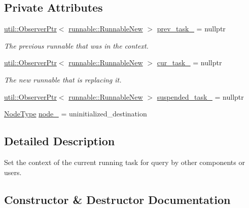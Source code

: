 \subsection*{Private Attributes}
\begin{DoxyCompactItemize}
\item 
\hyperlink{namespacevt_1_1util_a7d480434049896696b9a50c38a766202}{util\+::\+Observer\+Ptr}$<$ \hyperlink{structvt_1_1runnable_1_1_runnable_new}{runnable\+::\+Runnable\+New} $>$ \hyperlink{structvt_1_1ctx_1_1_set_context_af5a9e9f7f2f7deeadd17da554e8aa39b}{prev\+\_\+task\+\_\+} = nullptr
\begin{DoxyCompactList}\small\item\em The previous runnable that was in the context. \end{DoxyCompactList}\item 
\hyperlink{namespacevt_1_1util_a7d480434049896696b9a50c38a766202}{util\+::\+Observer\+Ptr}$<$ \hyperlink{structvt_1_1runnable_1_1_runnable_new}{runnable\+::\+Runnable\+New} $>$ \hyperlink{structvt_1_1ctx_1_1_set_context_a54caa513b9c676ccbd100f701f10ba81}{cur\+\_\+task\+\_\+} = nullptr
\begin{DoxyCompactList}\small\item\em The new runnable that is replacing it. \end{DoxyCompactList}\item 
\hyperlink{namespacevt_1_1util_a7d480434049896696b9a50c38a766202}{util\+::\+Observer\+Ptr}$<$ \hyperlink{structvt_1_1runnable_1_1_runnable_new}{runnable\+::\+Runnable\+New} $>$ \hyperlink{structvt_1_1ctx_1_1_set_context_a6c8795c11ee73b3f29b7a5266c53817c}{suspended\+\_\+task\+\_\+} = nullptr
\item 
\hyperlink{namespacevt_a866da9d0efc19c0a1ce79e9e492f47e2}{Node\+Type} \hyperlink{structvt_1_1ctx_1_1_set_context_a2dbb72742d51cb57da427ab187edde74}{node\+\_\+} = uninitialized\+\_\+destination
\end{DoxyCompactItemize}


\subsection{Detailed Description}
Set the context of the current running task for query by other components or users. 

\subsection{Constructor \& Destructor Documentation}
\mbox{\label{structvt_1_1ctx_1_1_set_context_afe7801893d4377046b6fc91c003bd883}} 
